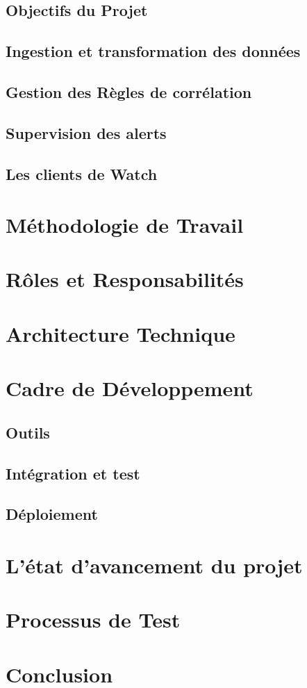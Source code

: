 \clearpage
\subsection{Objectifs du Projet}

\subsection{Ingestion et transformation des données}

\subsection{Gestion des Règles de corrélation}

\subsection{Supervision des alerts}

\subsection{Les clients de Watch}

\section{Méthodologie de Travail}

\section{Rôles et Responsabilités}

\section{Architecture Technique}

\section{Cadre de Développement}

\subsection{Outils}

\subsection{Intégration et test}

\subsection{Déploiement}

\section{L'état d'avancement du projet}

\section{Processus de Test}

\section{Conclusion}
